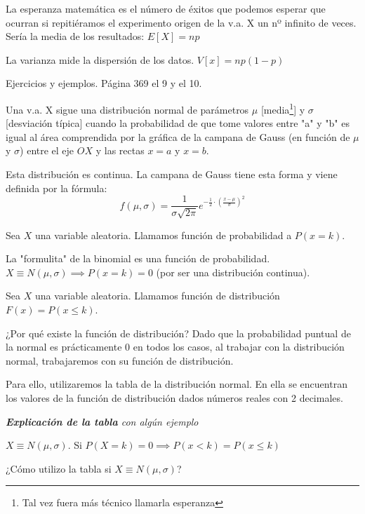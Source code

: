 La esperanza matemática es el número de éxitos que podemos esperar que ocurran si repitiéramos el experimento origen de la v.a. X un nº infinito de veces. Sería la media de los resultados: $E[X] = np$

La varianza mide la dispersión de los datos. $V[x] = np(1-p)$

Ejercicios y ejemplos. Página 369 el 9 y el 10.

\begin{defn}
Una v.a. X sigue una distribución normal de parámetros $\mu$ [media\footnote{Tal vez fuera más técnico llamarla esperanza}] y $\sigma$ [desviación típica] cuando la probabilidad de que tome valores entre "a" y "b" es igual al área comprendida por la gráfica de la campana de Gauss (en función de $\mu$ y $\sigma$) entre el eje $OX$ y las rectas $x=a$ y $x=b$.
\end{defn}

\obs Esta distribución es continua.
\obs La campana de Gauss tiene esta forma y viene definida por la fórmula: \[f(\mu,\sigma) = \displaystyle\frac{1}{\sigma\sqrt{2\pi}}e^{\displaystyle-\frac{1}{2}·\left(\frac{x-\mu}{\sigma}\right)^2}\]

\begin{defn}
Sea $X$ una variable aleatoria. Llamamos función de probabilidad a $P(x=k)$.
\end{defn}
\obs La "formulita" de la binomial es una función de probabilidad.
\obs $X\equiv N(\mu,\sigma) \implies P(x=k) = 0$ (por ser una distribución continua).

\begin{defn}
Sea $X$ una variable aleatoria. Llamamos función de distribución $F(x) = P(x\leq k)$.
\end{defn}

\obs ¿Por qué existe la función de distribución?
%
Dado que la probabilidad puntual de la normal es prácticamente 0 en todos los casos, al trabajar con la distribución normal, trabajaremos con su función de distribución.

Para ello, utilizaremos la tabla de la distribución normal. En ella se encuentran los valores de la función de distribución dados números reales con 2 decimales.

\textit{\textbf{Explicación de la tabla} con algún ejemplo}

\obs $X\equiv N(\mu,\sigma)$. Si $P(X=k) = 0 \implies P(x<k) = P(x\leq k)$

\obs ¿Cómo utilizo la tabla si $X\equiv N(\mu,\sigma)$? 

